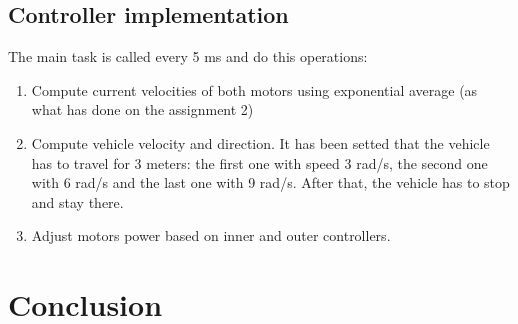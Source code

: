 \documentclass[a4paper,12pt,oneside]{article}
\begin{document}
\subsection{Controller implementation}
The main task is called every 5 ms and do this operations:
\begin{enumerate}
\item Compute current velocities of both motors using exponential average (as what has done on the assignment 2)
\item Compute vehicle velocity and direction. It has been setted that the vehicle has to travel for 3 meters: the first one with speed 3 rad/s, the second one with 6 rad/s and the last one with 9 rad/s. After that, the vehicle has to stop and stay there.
\item Adjust motors power based on inner and outer controllers.
\end{enumerate}
\section{Conclusion}
\end{document}

